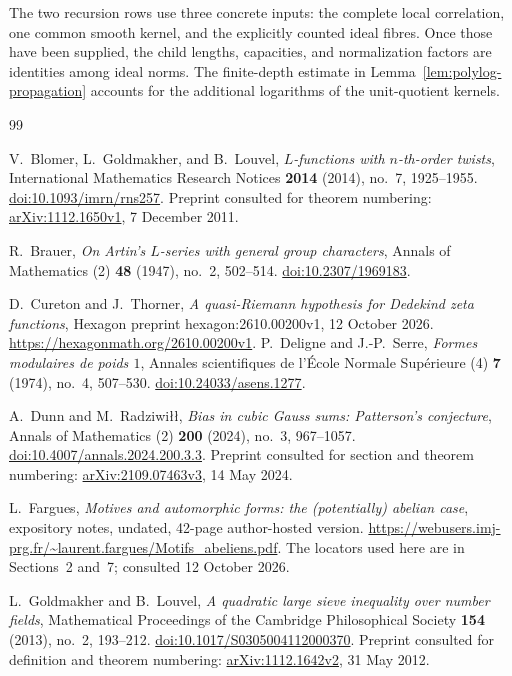 \documentclass[11pt,a4paper]{article}
\numberwithin{equation}{section}
\theoremstyle{definition}
\theoremstyle{remark}
\begin{document}
The two recursion rows use three concrete inputs: the complete local
correlation, one common smooth kernel, and the explicitly counted ideal
fibres. Once those have been supplied, the child lengths, capacities,
and normalization factors are identities among ideal norms. The
finite-depth estimate in Lemma~\ref{lem:polylog-propagation} accounts for
the additional logarithms of the unit-quotient kernels.

\begingroup
\small
\begin{thebibliography}{99}

V.~Blomer, L.~Goldmakher, and B.~Louvel,
\emph{$L$-functions with $n$-th-order twists},
International Mathematics Research Notices \textbf{2014} (2014), no.~7,
1925--1955.
\href{https://doi.org/10.1093/imrn/rns257}{doi:10.1093/imrn/rns257}.
Preprint consulted for theorem numbering:
\href{https://arxiv.org/abs/1112.1650v1}{arXiv:1112.1650v1}, 7 December 2011.

R.~Brauer,
\emph{On Artin's $L$-series with general group characters},
Annals of Mathematics (2) \textbf{48} (1947), no.~2, 502--514.
\href{https://doi.org/10.2307/1969183}{doi:10.2307/1969183}.

D.~Cureton and J.~Thorner,
\emph{A quasi-Riemann hypothesis for Dedekind zeta functions},
Hexagon preprint hexagon:2610.00200v1, 12 October 2026.
\url{https://hexagonmath.org/2610.00200v1}.
P.~Deligne and J.-P.~Serre,
\emph{Formes modulaires de poids $1$},
Annales scientifiques de l'\'Ecole Normale Sup\'erieure (4)
\textbf{7} (1974), no.~4, 507--530.
\href{https://doi.org/10.24033/asens.1277}{doi:10.24033/asens.1277}.

A.~Dunn and M.~Radziwi{\l}{\l},
\emph{Bias in cubic Gauss sums: Patterson's conjecture},
Annals of Mathematics (2) \textbf{200} (2024), no.~3, 967--1057.
\href{https://doi.org/10.4007/annals.2024.200.3.3}{doi:10.4007/annals.2024.200.3.3}.
Preprint consulted for section and theorem numbering:
\href{https://arxiv.org/abs/2109.07463v3}{arXiv:2109.07463v3}, 14 May 2024.

L.~Fargues,
\emph{Motives and automorphic forms: the (potentially) abelian case},
expository notes, undated, 42-page author-hosted version.
\url{https://webusers.imj-prg.fr/~laurent.fargues/Motifs_abeliens.pdf}.
The locators used here are in Sections~2 and~7; consulted 12 October 2026.

L.~Goldmakher and B.~Louvel,
\emph{A quadratic large sieve inequality over number fields},
Mathematical Proceedings of the Cambridge Philosophical Society
\textbf{154} (2013), no.~2, 193--212.
\href{https://doi.org/10.1017/S0305004112000370}{doi:10.1017/S0305004112000370}.
Preprint consulted for definition and theorem numbering:
\href{https://arxiv.org/abs/1112.1642v2}{arXiv:1112.1642v2}, 31 May 2012.


\end{thebibliography}
\end{document}

